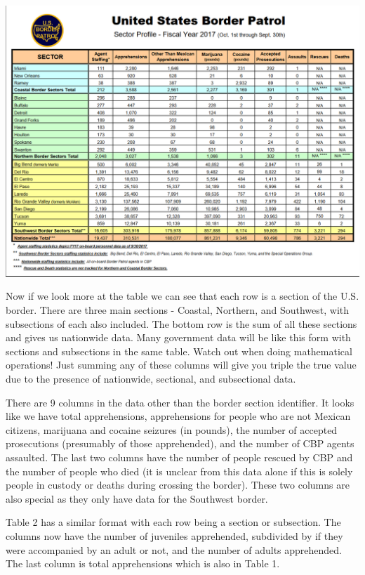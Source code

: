 \documentclass[
  12pt,
]{book}
\begin{document}
\includegraphics{images/pdf_table_1.PNG}

Now if we look more at the table we can see that each row is a section of the U.S. border. There are three main sections - Coastal, Northern, and Southwest, with subsections of each also included. The bottom row is the sum of all these sections and gives us nationwide data. Many government data will be like this form with sections and subsections in the same table. Watch out when doing mathematical operations! Just summing any of these columns will give you triple the true value due to the presence of nationwide, sectional, and subsectional data.

There are 9 columns in the data other than the border section identifier. It looks like we have total apprehensions, apprehensions for people who are not Mexican citizens, marijuana and cocaine seizures (in pounds), the number of accepted prosecutions (presumably of those apprehended), and the number of CBP agents assaulted. The last two columns have the number of people rescued by CBP and the number of people who died (it is unclear from this data alone if this is solely people in custody or deaths during crossing the border). These two columns are also special as they only have data for the Southwest border.

Table 2 has a similar format with each row being a section or subsection. The columns now have the number of juveniles apprehended, subdivided by if they were accompanied by an adult or not, and the number of adults apprehended. The last column is total apprehensions which is also in Table 1.
\end{document}
